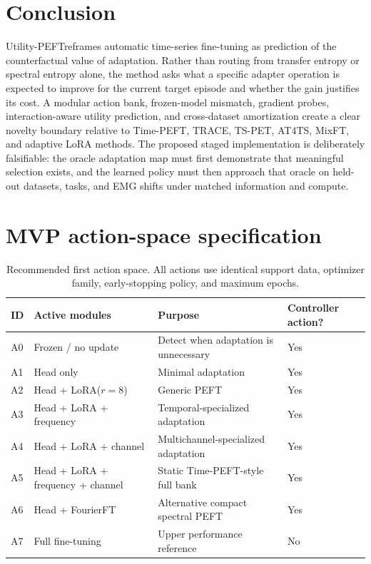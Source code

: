 \documentclass[10pt]{article}
\newcommand{\method}{Utility-PEFT}
\begin{document}
\section{Conclusion}

\method reframes automatic time-series fine-tuning as prediction of the counterfactual value of adaptation. Rather than routing from transfer entropy or spectral entropy alone, the method asks what a specific adapter operation is expected to improve for the current target episode and whether the gain justifies its cost. A modular action bank, frozen-model mismatch, gradient probes, interaction-aware utility prediction, and cross-dataset amortization create a clear novelty boundary relative to Time-PEFT, TRACE, TS-PET, AT4TS, MixFT, and adaptive LoRA methods. The proposed staged implementation is deliberately falsifiable: the oracle adaptation map must first demonstrate that meaningful selection exists, and the learned policy must then approach that oracle on held-out datasets, tasks, and EMG shifts under matched information and compute.

\clearpage
\appendix

\section{MVP action-space specification}

\begin{table}[h]
\centering
\caption{Recommended first action space. All actions use identical support data, optimizer family, early-stopping policy, and maximum epochs.}
\begin{tabularx}{\textwidth}{L{0.09\textwidth}L{0.28\textwidth}YY}
\toprule
ID & Active modules & Purpose & Controller action? \\
\midrule
A0 & Frozen / no update & Detect when adaptation is unnecessary & Yes \\
A1 & Head only & Minimal adaptation & Yes \\
A2 & Head + LoRA($r=8$) & Generic PEFT & Yes \\
A3 & Head + LoRA + frequency & Temporal-specialized adaptation & Yes \\
A4 & Head + LoRA + channel & Multichannel-specialized adaptation & Yes \\
A5 & Head + LoRA + frequency + channel & Static Time-PEFT-style full bank & Yes \\
A6 & Head + FourierFT & Alternative compact spectral PEFT & Yes \\
A7 & Full fine-tuning & Upper performance reference & No \\
\bottomrule
\end{tabularx}
\end{table}
\end{document}
